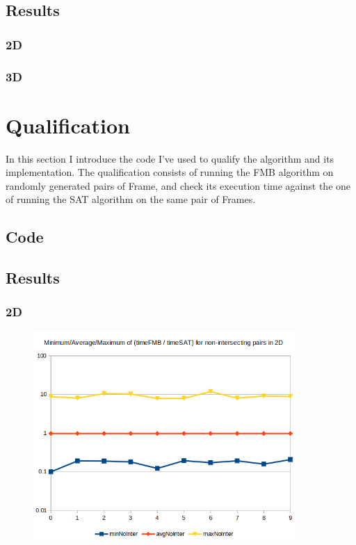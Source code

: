 \documentclass[12pt, a4paper]{article}
\begin{document}
\subsection{Results}

\subsubsection{2D}

\subsubsection{3D}

\section{Qualification}

In this section I introduce the code I've used to qualify the algorithm and its implementation. The qualification consists of running the FMB algorithm on randomly generated pairs of Frame, and check its execution time against the one of running the SAT algorithm on the same pair of Frames.\\

\subsection{Code}

\begin{scriptsize}
\begin{ttfamily}

\end{ttfamily}
\end{scriptsize}

\subsection{Results}

\subsubsection{2D}

\begin{center}
\begin{figure}[H]
\centering\includegraphics[width=10cm]{./2dnointer.png}\\
\end{figure}
\end{center}
\end{document}
